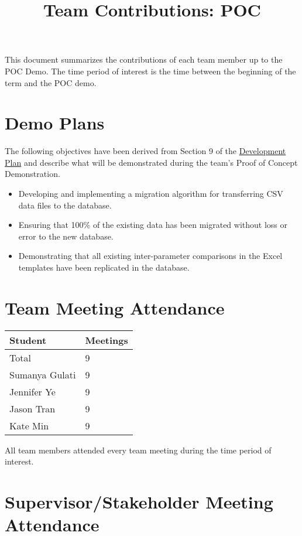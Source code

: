 \documentclass{article}
\title{Team Contributions: POC\\\progname}
\author{\authname}
\date{}
\begin{document}
\maketitle

This document summarizes the contributions of each team member up to the POC
Demo.  The time period of interest is the time between the beginning of the term
and the POC demo.

\section{Demo Plans}

The following objectives have been derived from Section 9 of the
\href{https://github.com/SumanyaG/Alkalytics/blob/main/docs/DevelopmentPlan/DevelopmentPlan.pdf}{Development
Plan} and describe what will be demonstrated during the team's Proof of
Concept Demonstration.
\begin{itemize}
  \item Developing and implementing a migration algorithm for transferring CSV
  data files to the database. 
  \item Ensuring that 100\% of the existing data has been migrated  without loss
  or error to the new database.
  \item Demonstrating that all existing inter-parameter comparisons in the Excel
  templates have been replicated in the database.
\end{itemize}

\section{Team Meeting Attendance}

\begin{table}[H]
\centering
\begin{tabular}{ll}
\toprule
\textbf{Student} & \textbf{Meetings}\\
\midrule
Total & 9\\
Sumanya Gulati & 9\\
Jennifer Ye & 9\\
Jason Tran & 9\\
Kate Min & 9\\
\bottomrule
\end{tabular}
\end{table}

All team members attended every team meeting during the time period of interest.

\section{Supervisor/Stakeholder Meeting Attendance}
\end{document}
